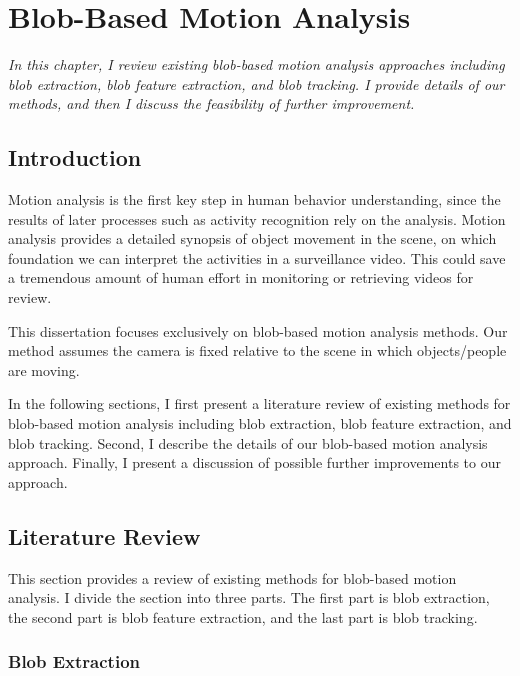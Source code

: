 \setlength{\footskip}{8mm}

\chapter{Blob-Based Motion Analysis}
\label{ch:blobanalysis}

\textit{In this chapter, I review existing blob-based motion analysis
approaches including blob extraction, blob feature extraction, and
blob tracking. I provide details of our methods, and then I discuss
the feasibility of further improvement.}

\section{Introduction}

Motion analysis is the first key step in human behavior understanding,
since the results of later processes such as activity recognition rely
on the analysis.  Motion analysis provides a detailed synopsis of
object movement in the scene, on which foundation we can interpret the
activities in a surveillance video. This could save a tremendous
amount of human effort in monitoring or retrieving videos for review.

This dissertation focuses exclusively on blob-based motion analysis
methods. Our method assumes the camera is fixed relative to the scene
in which objects/people are moving.

In the following sections, I first present a literature review of existing 
methods for blob-based motion analysis including blob extraction, blob feature 
extraction, and blob tracking. Second, I describe the details of our blob-based 
motion analysis approach. Finally, I present a discussion of possible further 
improvements to our approach.

\section{Literature Review}

This section provides a review of existing methods for blob-based
motion analysis. I divide the section into three parts. The first
part is blob extraction, the second part is blob feature
extraction, and the last part is blob tracking.

\subsection{Blob Extraction}

